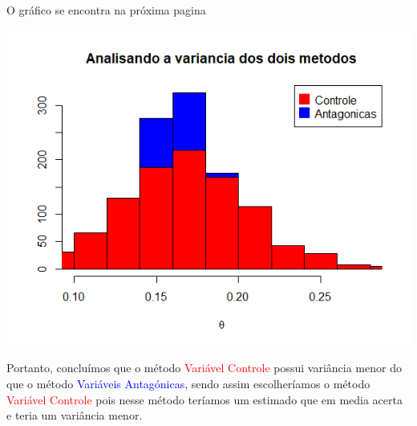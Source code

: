\documentclass[11pt,a4paper]{article}
\begin{document}
O gráfico se encontra na próxima pagina

\begin{center}
\includegraphics[width=.5\linewidth]{Grafico.png}
\end{center}

Portanto, concluímos que o método \textcolor{red}{Variável Controle} possui variância menor do que o método  \textcolor{blue}{Variáveis Antagónicas}, sendo assim escolheríamos o método   \textcolor{red}{Variável Controle} pois nesse método teríamos um estimado que em media acerta e teria um variância menor.
\end{document}
